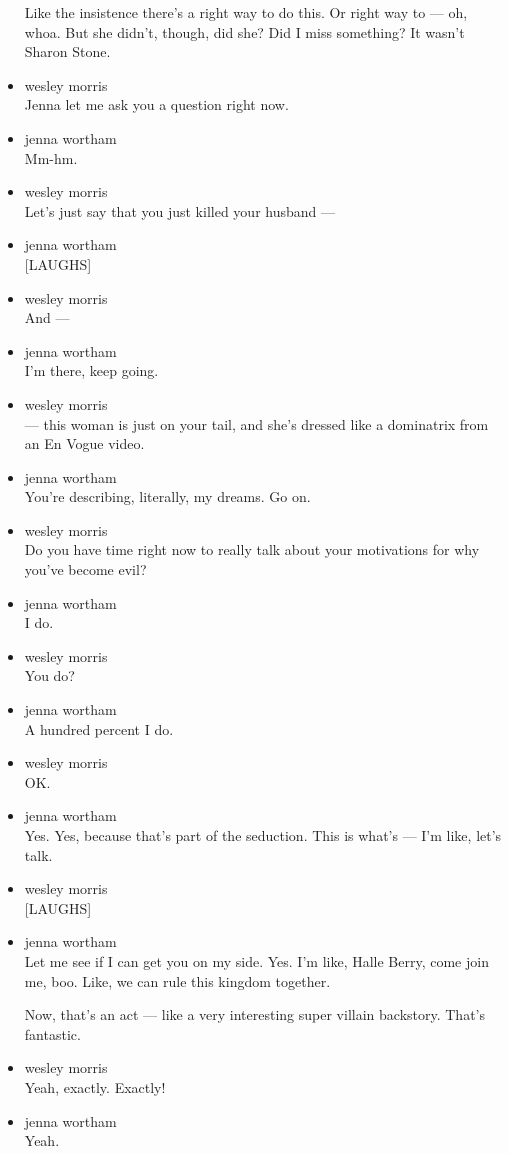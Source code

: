 \begin{itemize}
  Like the insistence there's a right way to do this. Or right way to
  --- oh, whoa. But she didn't, though, did she? Did I miss something?
  It wasn't Sharon Stone.
\item
  wesley morris\\
  Jenna let me ask you a question right now.
\item
  jenna wortham\\
  Mm-hm.
\item
  wesley morris\\
  Let's just say that you just killed your husband ---
\item
  jenna wortham\\
  {[}LAUGHS{]}
\item
  wesley morris\\
  And ---
\item
  jenna wortham\\
  I'm there, keep going.
\item
  wesley morris\\
  --- this woman is just on your tail, and she's dressed like a
  dominatrix from an En Vogue video.
\item
  jenna wortham\\
  You're describing, literally, my dreams. Go on.
\item
  wesley morris\\
  Do you have time right now to really talk about your motivations for
  why you've become evil?
\item
  jenna wortham\\
  I do.
\item
  wesley morris\\
  You do?
\item
  jenna wortham\\
  A hundred percent I do.
\item
  wesley morris\\
  OK.
\item
  jenna wortham\\
  Yes. Yes, because that's part of the seduction. This is what's --- I'm
  like, let's talk.
\item
  wesley morris\\
  {[}LAUGHS{]}
\item
  jenna wortham\\
  Let me see if I can get you on my side. Yes. I'm like, Halle Berry,
  come join me, boo. Like, we can rule this kingdom together.

  Now, that's an act --- like a very interesting super villain
  backstory. That's fantastic.
\item
  wesley morris\\
  Yeah, exactly. Exactly!
\item
  jenna wortham\\
  Yeah.


\end{itemize}
